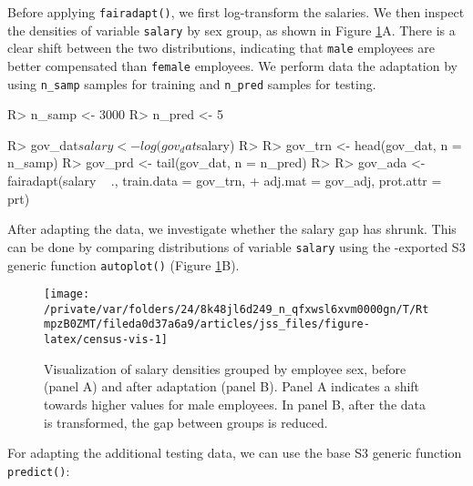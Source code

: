 \documentclass[
  nojss]{jss}
\begin{document}
Before applying \texttt{fairadapt()}, we first log-transform the
salaries. We then inspect the densities of variable \texttt{salary} by
sex group, as shown in Figure \ref{fig:census-vis}A. There is a clear
shift between the two distributions, indicating that \texttt{male}
employees are better compensated than \texttt{female} employees. We
perform data the adaptation by using \texttt{n\_samp} samples for
training and \texttt{n\_pred} samples for testing.

\begin{CodeChunk}
\begin{CodeInput}
R> n_samp <- 3000
R> n_pred <- 5
\end{CodeInput}
\end{CodeChunk}

\begin{CodeChunk}
\begin{CodeInput}
R> gov_dat$salary <- log(gov_dat$salary)
R> 
R> gov_trn <- head(gov_dat, n = n_samp)
R> gov_prd <- tail(gov_dat, n = n_pred)
R> 
R> gov_ada <- fairadapt(salary ~ ., train.data = gov_trn,
+                      adj.mat = gov_adj, prot.attr = prt)
\end{CodeInput}
\end{CodeChunk}

After adapting the data, we investigate whether the salary gap has
shrunk. This can be done by comparing distributions of variable
\texttt{salary} using the -exported S3 generic function
\texttt{autoplot()} (Figure \ref{fig:census-vis}B).

\begin{CodeChunk}
\begin{figure}

{\centering \texttt{[image: /private/var/folders/24/8k48jl6d249\_n\_qfxwsl6xvm0000gn/T/RtmpzB0ZMT/fileda0d37a6a9/articles/jss\_files/figure-latex/census-vis-1]} 

}

\caption[Visualization of salary densities grouped by employee sex, before (panel A) and after adaptation (panel B)]{Visualization of salary densities grouped by employee sex, before (panel A) and after adaptation (panel B). Panel A indicates a shift towards higher values for male employees. In panel B, after the data is transformed, the gap between groups is reduced.}\label{fig:census-vis}
\end{figure}
\end{CodeChunk}

For adapting the additional testing data, we can use the base
 S3 generic function \texttt{predict()}:
\end{document}
